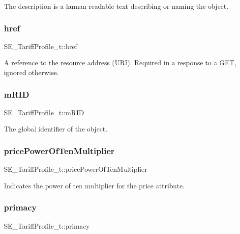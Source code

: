 The description is a human readable text describing or naming the object. \mbox{\label{group__TariffProfile_gaed6a5a993529e6bd90753740488cf545}} 
\subsubsection{\texorpdfstring{href}{href}}
{\footnotesize\ttfamily S\+E\+\_\+\+Tariff\+Profile\+\_\+t\+::href}

A reference to the resource address (U\+RI). Required in a response to a G\+ET, ignored otherwise. \mbox{\label{group__TariffProfile_ga176923870d71122bf68ca1ce65ab011c}} 
\subsubsection{\texorpdfstring{m\+R\+ID}{mRID}}
{\footnotesize\ttfamily S\+E\+\_\+\+Tariff\+Profile\+\_\+t\+::m\+R\+ID}

The global identifier of the object. \mbox{\label{group__TariffProfile_gade0e52155091cbae350b4670990fc823}} 
\subsubsection{\texorpdfstring{price\+Power\+Of\+Ten\+Multiplier}{pricePowerOfTenMultiplier}}
{\footnotesize\ttfamily S\+E\+\_\+\+Tariff\+Profile\+\_\+t\+::price\+Power\+Of\+Ten\+Multiplier}

Indicates the power of ten multiplier for the price attribute. \mbox{\label{group__TariffProfile_gab14fe928719a93747ef7d7c85a4a86f8}} 
\subsubsection{\texorpdfstring{primacy}{primacy}}
{\footnotesize\ttfamily S\+E\+\_\+\+Tariff\+Profile\+\_\+t\+::primacy}

